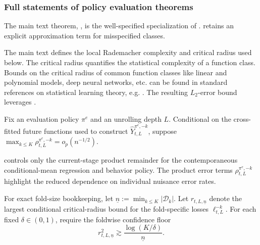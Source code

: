 \documentclass[opre,nonblindrev]{informs4}
\providecommand{\cD}{\mathcal D}
\newcommand{\norm}[1]{\lVert#1\rVert}
\newcommand{\blipadv}{\tau}
\begin{document}
\subsubsection{Full statements of policy evaluation theorems}
\begin{remark}
The main text theorem, , is the well-specified specialization of
.
 retains an explicit approximation
term for misspecified classes. 
\end{remark}
The main text defines the local Rademacher complexity and critical radius used
below. The critical radius quantifies the statistical complexity of a function
class. Bounds on the critical radius of common function classes like linear
and polynomial models, deep neural networks, etc. can be found in standard
references on statistical learning theory, e.g. \citet{wainwright2019high}.
The resulting $L_2$-error bound leverages \citet{foster2019orthogonal}.

\begin{assumption}\label{asn-producterrorrates-full-apx}
Fix an evaluation policy $\pi^e$ and an unrolling depth $L$. Conditional on
the cross-fitted future functions used to construct
$\hat Y_{t,L}^{\pi^e,-k}$, suppose
$\max_{k\leq K}\rho_{t,L}^{\pi^e,-k}=o_p(n^{-1/2})$.
\end{assumption}
 controls only the current-stage
product remainder for the contemporaneous
conditional-mean regression and behavior policy.
The product error terms $\rho_{t,L}^{\pi^e,-k}$ highlight the reduced dependence
on individual nuisance error rates.

For exact fold-size bookkeeping, let
$\underline n:=\min_{k\le K}|\cD_k|$.
Let $r_{t,L,\underline n}$ denote the largest conditional critical-radius
bound for the fold-specific losses $\ell_{t,L}^{-k}$.
For each fixed $\delta\in(0,1)$, require the foldwise confidence floor
\[
r_{t,L,\underline n}^{2}\gtrsim
\frac{\log(K/\delta)}{\underline n}.
\]
\end{document}
